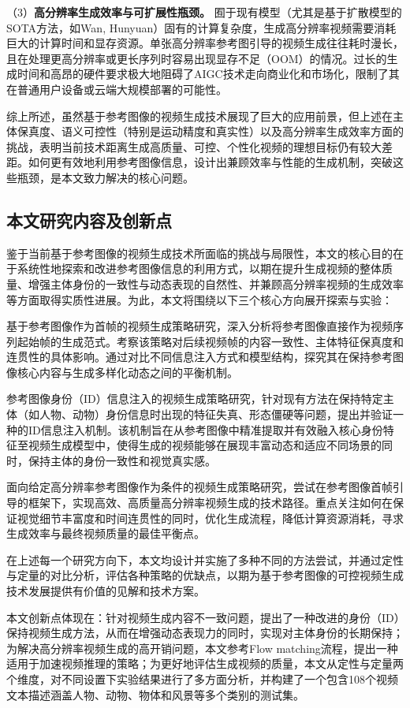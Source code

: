 （3）\textbf{高分辨率生成效率与可扩展性瓶颈。} 囿于现有模型（尤其是基于扩散模型的SOTA方法，如Wan\cite{wan2025}, Hunyuan\cite{sun2024hunyuan}）固有的计算复杂度，生成高分辨率视频需要消耗巨大的计算时间和显存资源。单张高分辨率参考图引导的视频生成往往耗时漫长，且在处理更高分辨率或更长序列时容易出现显存不足（OOM）的情况。过长的生成时间和高昂的硬件要求极大地阻碍了AIGC技术走向商业化和市场化，限制了其在普通用户设备或云端大规模部署的可能性。

综上所述，虽然基于参考图像的视频生成技术展现了巨大的应用前景，但上述在主体保真度、语义可控性（特别是运动精度和真实性）以及高分辨率生成效率方面的挑战，表明当前技术距离生成高质量、可控、个性化视频的理想目标仍有较大差距。如何更有效地利用参考图像信息，设计出兼顾效率与性能的生成机制，突破这些瓶颈，是本文致力解决的核心问题。

\subsection{本文研究内容及创新点}
鉴于当前基于参考图像的视频生成技术所面临的挑战与局限性，本文的核心目的在于系统性地探索和改进参考图像信息的利用方式，以期在提升生成视频的整体质量、增强主体身份的一致性与动态表现的自然性、并兼顾高分辨率视频的生成效率等方面取得实质性进展。为此，本文将围绕以下三个核心方向展开探索与实验：

基于参考图像作为首帧的视频生成策略研究，深入分析将参考图像直接作为视频序列起始帧的生成范式。考察该策略对后续视频帧的内容一致性、主体特征保真度和连贯性的具体影响。通过对比不同信息注入方式和模型结构，探究其在保持参考图像核心内容与生成多样化动态之间的平衡机制。

参考图像身份（ID）信息注入的视频生成策略研究，针对现有方法在保持特定主体（如人物、动物）身份信息时出现的特征失真、形态僵硬等问题，提出并验证一种的ID信息注入机制。该机制旨在从参考图像中精准提取并有效融入核心身份特征至视频生成模型中，使得生成的视频能够在展现丰富动态和适应不同场景的同时，保持主体的身份一致性和视觉真实感。

面向给定高分辨率参考图像作为条件的视频生成策略研究，尝试在参考图像首帧引导的框架下，实现高效、高质量高分辨率视频生成的技术路径。重点关注如何在保证视觉细节丰富度和时间连贯性的同时，优化生成流程，降低计算资源消耗，寻求生成效率与最终视频质量的最佳平衡点。

在上述每一个研究方向下，本文均设计并实施了多种不同的方法尝试，并通过定性与定量的对比分析，评估各种策略的优缺点，以期为基于参考图像的可控视频生成技术发展提供有价值的见解和技术方案。

本文创新点体现在：针对视频生成内容不一致问题，提出了一种改进的身份（ID）保持视频生成方法，从而在增强动态表现力的同时，实现对主体身份的长期保持；为解决高分辨率视频生成的高开销问题，本文参考Flow matching流程，提出一种适用于加速视频推理的策略；为更好地评估生成视频的质量，本文从定性与定量两个维度，对不同设置下实验结果进行了多方面分析，并构建了一个包含108个视频文本描述涵盖人物、动物、物体和风景等多个类别的测试集。

